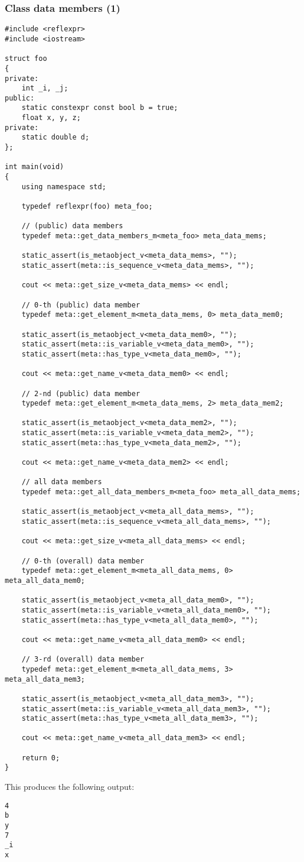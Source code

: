 \subsubsection{Class data members (1)}

\begin{verbatim}
#include <reflexpr>
#include <iostream>

struct foo
{
private:
	int _i, _j;
public:
	static constexpr const bool b = true;
	float x, y, z;
private:
	static double d;
};

int main(void)
{
	using namespace std;

	typedef reflexpr(foo) meta_foo;

	// (public) data members
	typedef meta::get_data_members_m<meta_foo> meta_data_mems;

	static_assert(is_metaobject_v<meta_data_mems>, "");
	static_assert(meta::is_sequence_v<meta_data_mems>, "");

	cout << meta::get_size_v<meta_data_mems> << endl;

	// 0-th (public) data member
	typedef meta::get_element_m<meta_data_mems, 0> meta_data_mem0;

	static_assert(is_metaobject_v<meta_data_mem0>, "");
	static_assert(meta::is_variable_v<meta_data_mem0>, "");
	static_assert(meta::has_type_v<meta_data_mem0>, "");

	cout << meta::get_name_v<meta_data_mem0> << endl;

	// 2-nd (public) data member
	typedef meta::get_element_m<meta_data_mems, 2> meta_data_mem2;

	static_assert(is_metaobject_v<meta_data_mem2>, "");
	static_assert(meta::is_variable_v<meta_data_mem2>, "");
	static_assert(meta::has_type_v<meta_data_mem2>, "");

	cout << meta::get_name_v<meta_data_mem2> << endl;

	// all data members
	typedef meta::get_all_data_members_m<meta_foo> meta_all_data_mems;

	static_assert(is_metaobject_v<meta_all_data_mems>, "");
	static_assert(meta::is_sequence_v<meta_all_data_mems>, "");

	cout << meta::get_size_v<meta_all_data_mems> << endl;

	// 0-th (overall) data member
	typedef meta::get_element_m<meta_all_data_mems, 0> meta_all_data_mem0;

	static_assert(is_metaobject_v<meta_all_data_mem0>, "");
	static_assert(meta::is_variable_v<meta_all_data_mem0>, "");
	static_assert(meta::has_type_v<meta_all_data_mem0>, "");

	cout << meta::get_name_v<meta_all_data_mem0> << endl;

	// 3-rd (overall) data member
	typedef meta::get_element_m<meta_all_data_mems, 3> meta_all_data_mem3;

	static_assert(is_metaobject_v<meta_all_data_mem3>, "");
	static_assert(meta::is_variable_v<meta_all_data_mem3>, "");
	static_assert(meta::has_type_v<meta_all_data_mem3>, "");

	cout << meta::get_name_v<meta_all_data_mem3> << endl;

	return 0;
}

\end{verbatim}

This produces the following output:

\begin{verbatim}
4
b
y
7
_i
x
\end{verbatim}
